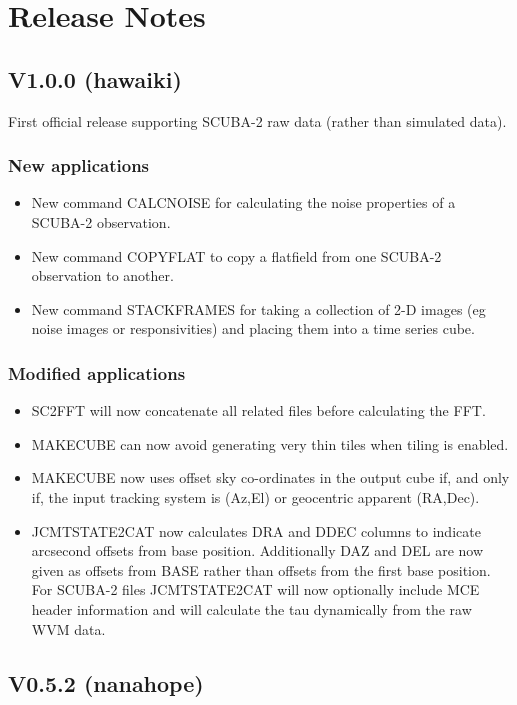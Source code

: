 \documentclass[twoside,11pt]{article}
\renewcommand{\_}{\texttt{\symbol{95}}}
\begin{document}
\section{Release Notes}

\subsection{V1.0.0 (hawaiki)}

First official release supporting SCUBA-2 raw data (rather than simulated data).

\subsubsection*{New applications}
\begin{itemize}
\item New command CALCNOISE for calculating the noise properties of a SCUBA-2 observation.
\item New command COPYFLAT to copy a flatfield from one SCUBA-2 observation to another.
\item New command STACKFRAMES for taking a collection of 2-D images
  (eg noise images or responsivities) and placing them into a time
  series cube.
\end{itemize}

\subsubsection*{Modified applications}
\begin{itemize}
\item SC2FFT will now concatenate all related files before calculating the FFT.
\item MAKECUBE can now avoid generating very thin tiles when tiling is enabled.
\item MAKECUBE now uses offset sky co-ordinates in the output cube if,
  and only if, the input tracking system is (Az,El) or geocentric
  apparent (RA,Dec).
\item JCMTSTATE2CAT now calculates DRA and DDEC columns to indicate
  arcsecond offsets from base position. Additionally DAZ and DEL are
  now given as offsets from BASE rather than offsets from the first
  base position. For SCUBA-2 files JCMTSTATE2CAT will now optionally include
  MCE header information and will calculate the tau dynamically from the
  raw WVM data.
\end{itemize}

\subsection{V0.5.2 (nanahope)}
\end{document}
